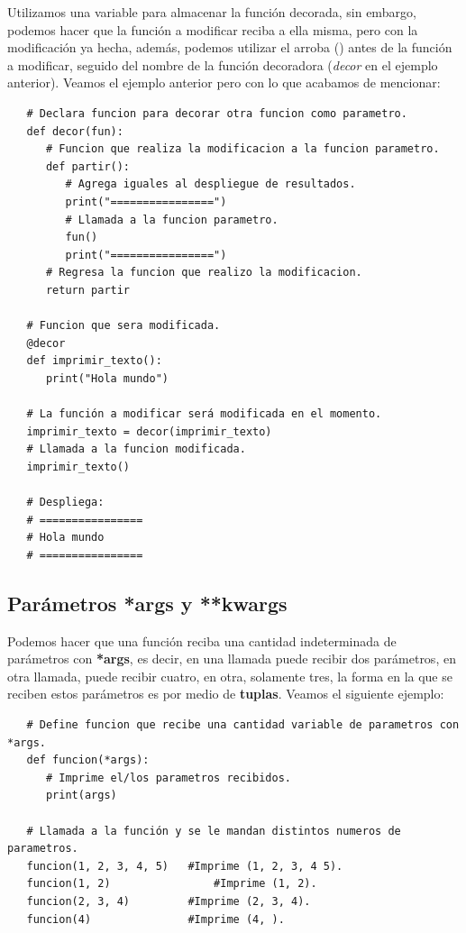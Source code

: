 Utilizamos una variable para almacenar la función decorada, sin embargo, podemos hacer que la función a modificar reciba a ella misma, pero con la modificación ya hecha, además, podemos utilizar el arroba (\@) antes de la función a modificar, seguido del nombre de la función decoradora (\textit{decor} en el ejemplo anterior). Veamos el ejemplo anterior pero con lo que acabamos de mencionar:
\begin{lstlisting}
   # Declara funcion para decorar otra funcion como parametro.
   def decor(fun):
      # Funcion que realiza la modificacion a la funcion parametro.
      def partir():
         # Agrega iguales al despliegue de resultados.
         print("================")
         # Llamada a la funcion parametro.
         fun()
         print("================")
      # Regresa la funcion que realizo la modificacion.
      return partir
      
   # Funcion que sera modificada.
   @decor
   def imprimir_texto():
      print("Hola mundo")
   
   # La función a modificar será modificada en el momento.
   imprimir_texto = decor(imprimir_texto)
   # Llamada a la funcion modificada.
   imprimir_texto()   
   
   # Despliega:
   # ================
   # Hola mundo
   # ================
\end{lstlisting}


\subsection{Parámetros *args y **kwargs}
\hspace{0.55cm}Podemos hacer que una función reciba una cantidad indeterminada de parámetros con \textbf{*args}, es decir, en una llamada puede recibir dos parámetros, en otra llamada, puede recibir cuatro, en otra, solamente tres, la forma en la que se reciben estos parámetros es por medio de \textbf{tuplas}. Veamos el siguiente ejemplo:
\begin{lstlisting}
   # Define funcion que recibe una cantidad variable de parametros con *args.
   def funcion(*args):
      # Imprime el/los parametros recibidos.
      print(args)
   
   # Llamada a la función y se le mandan distintos numeros de parametros.   
   funcion(1, 2, 3, 4, 5)	#Imprime (1, 2, 3, 4 5).
   funcion(1, 2)				#Imprime (1, 2).
   funcion(2, 3, 4)			#Imprime (2, 3, 4).
   funcion(4)				#Imprime (4, ).
\end{lstlisting}

